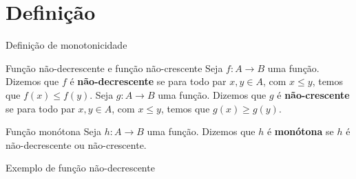 \section{Definição}

\begin{frame}[fragile]{Definição de monotonicidade}

    \begin{block}{Função não-decrescente e função não-crescente}
        Seja $f: A\to B$ uma função. Dizemos que $f$ é \textbf{não-decrescente} se para todo par
            $x, y\in A$, com $x\leq y$, temos que $f(x)\leq f(y)$. \newline\newline
        Seja $g: A\to B$ uma função. Dizemos que $g$ é \textbf{não-crescente} se para todo par
            $x, y\in A$, com $x\leq y$, temos que $g(x)\geq g(y)$.
    \end{block}

    \vspace{0.2in}
    \begin{block}{Função monótona}
        Seja $h: A\to B$ uma função. Dizemos que $h$ é \textbf{monótona} se $h$ é não-decrescente ou
            não-crescente.
    \end{block}

\end{frame}

\begin{frame}[fragile]{Exemplo de função não-decrescente}

    \begin{figure}
        \centering


    \end{figure}
\end{frame}

